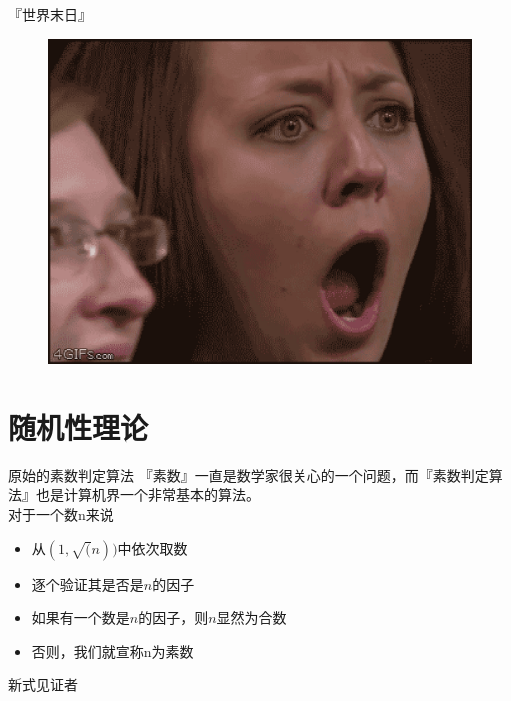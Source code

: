 \documentclass{beamer}
\newcommand{\wuhao}{\fontsize{10.5pt}{\baselineskip}\selectfont}
\begin{document}
\begin{frame}{『世界末日』}
\begin{figure}
\begin{minipage}[b]{0.3\textwidth}
		\end{minipage}
		\begin{minipage}[b]{0.3\textwidth}\centering
			\includegraphics[scale=0.15]{figures/mgd3.eps}
		\end{minipage}
	\end{figure}
\end{frame}

\section{随机性理论}
\begin{frame}{原始的素数判定算法}
	『素数』一直是数学家很关心的一个问题，而『素数判定算法』也是计算机界一个非常基本的算法。\\
	对于一个数n来说
	\begin{itemize}
	\item 从$(1, \sqrt(n))$中依次取数
	\item 逐个验证其是否是$n$的因子
	\item 如果有一个数是$n$的因子，则$n$显然为合数
	\item 否则，我们就宣称n为素数
	\end{itemize}

\end{frame}
\begin{frame}{新式见证者}
	\wuhao{2的127次方减1，是一个38位数，要验证它是否为素数，假设计算机每秒钟能运算1亿次除法，那么用当时最好的素数判断算法，也需要93年才能得出结论。}
	\begin{example}
	\\
	\\
	\\
	\\
	\end{example}
\end{frame}
\end{document}
